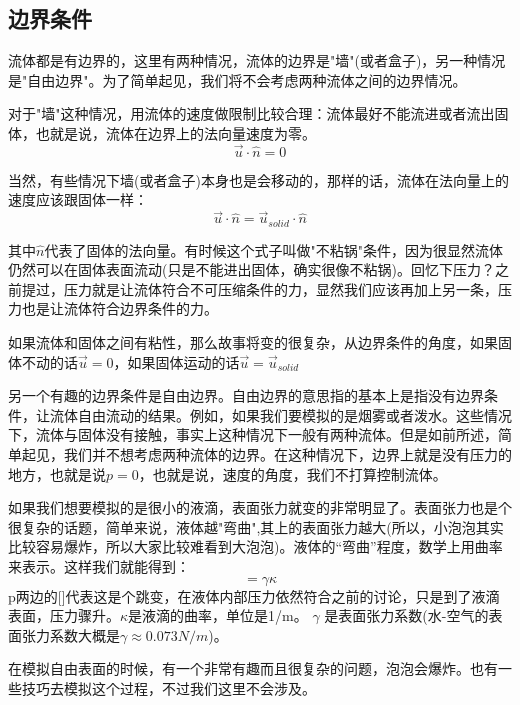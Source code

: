\documentclass{article}
\begin{document}
\subsection{边界条件}
流体都是有边界的，这里有两种情况，流体的边界是"墙"(或者盒子)，另一种情况是"自由边界"。为了简单起见，我们将不会考虑两种流体之间的边界情况。\par
对于"墙"这种情况，用流体的速度做限制比较合理：流体最好不能流进或者流出固体，也就是说，流体在边界上的法向量速度为零。
\begin{equation}
\vec{u}\cdot\hat{n}=0
\end{equation}
\par
当然，有些情况下墙(或者盒子)本身也是会移动的，那样的话，流体在法向量上的速度应该跟固体一样：
\begin{equation}
\vec{u}\cdot\hat{n}=\vec{u}_{solid}\cdot{\hat{n}}
\end{equation}
\par
其中$\hat{n}$代表了固体的法向量。有时候这个式子叫做"不粘锅"条件，因为很显然流体仍然可以在固体表面流动(只是不能进出固体，确实很像不粘锅)。回忆下压力？之前提过，压力就是让流体符合不可压缩条件的力，显然我们应该再加上另一条，压力也是让流体符合边界条件的力。\par
如果流体和固体之间有粘性，那么故事将变的很复杂，从边界条件的角度，如果固体不动的话$\vec{u}=0$，如果固体运动的话$\vec{u}=\vec{u}_{solid}$
\par
另一个有趣的边界条件是自由边界。自由边界的意思指的基本上是指没有边界条件，让流体自由流动的结果。例如，如果我们要模拟的是烟雾或者泼水。这些情况下，流体与固体没有接触，事实上这种情况下一般有两种流体。但是如前所述，简单起见，我们并不想考虑两种流体的边界。在这种情况下，边界上就是没有压力的地方，也就是说$p=0$，也就是说，速度的角度，我们不打算控制流体。
\par
如果我们想要模拟的是很小的液滴，表面张力就变的非常明显了。表面张力也是个很复杂的话题，简单来说，液体越"弯曲",其上的表面张力越大(所以，小泡泡其实比较容易爆炸，所以大家比较难看到大泡泡)。液体的“弯曲”程度，数学上用曲率来表示。这样我们就能得到：
\begin{equation}
[p]=\gamma\kappa
\end{equation}
p两边的[]代表这是个跳变，在液体内部压力依然符合之前的讨论，只是到了液滴表面，压力骤升。$\kappa$是液滴的曲率，单位是1/m。 $\gamma$ 是表面张力系数(水-空气的表面张力系数大概是$\gamma\approx 0.073N/m$)。
\par
在模拟自由表面的时候，有一个非常有趣而且很复杂的问题，泡泡会爆炸。也有一些技巧去模拟这个过程，不过我们这里不会涉及。
\end{document}

